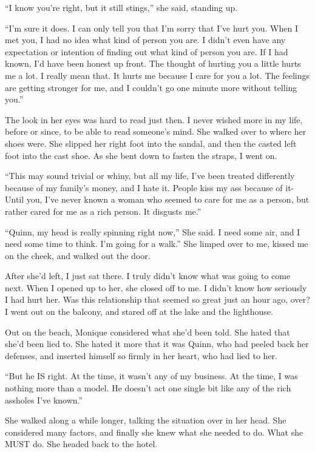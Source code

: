 ``I know you're right, but it still stings,'' she said, standing up.

``I'm sure it does. I can only tell you that I'm sorry that I've hurt you. When I met you, I
had no idea what kind of person you are. I didn't even have any expectation or intention of
finding out what kind of person you are. If I had known, I'd have been honest up front. The
thought of hurting you a little hurts me a lot. I really mean that. It hurts me because I care
for you a lot. The feelings are getting stronger for me, and I couldn't go one minute more
without telling you.''

The look in her eyes was hard to read just then. I never wished more in my life, before or
since, to be able to read someone's mind. She walked over to where her shoes were. She slipped
her right foot into the sandal, and then the casted left foot into the cast shoe. As she bent
down to fasten the straps, I went on.

``This may sound trivial or whiny, but all my life, I've been treated differently because of
my family's money, and I hate it. People kiss my ass because of it- Until you, I've never known
a woman who seemed to care for me as a person, but rather cared for me as a rich person. It
disgusts me.''

``Quinn, my head is really spinning right now,'' She said. I need some air, and I need some
time to think. I'm going for a walk.'' She limped over to me, kissed me on the cheek, and walked
out the door.

After she'd left, I just sat there. I truly didn't know what was going to come next. When I
opened up to her, she closed off to me. I didn't know how seriously I had hurt her. Was this
relationship that seemed so great just an hour ago, over? I went out on the balcony, and stared
off at the lake and the lighthouse.

\begin{thought}
Out on the beach, Monique considered what she'd been told. She hated that she'd been lied
to. She hated it more that it was Quinn, who had peeled back her defenses, and inserted himself
so firmly in her heart, who had lied to her.

``But he IS right. At the time, it wasn't any of my business. At the time, I was nothing
more than a model. He doesn't act one single bit like any of the rich assholes I've known.''
\end{thought}

She walked along a while longer, talking the situation over in her head. She considered
many factors, and finally she knew what she needed to do. What she MUST do. She headed back to
the hotel.

